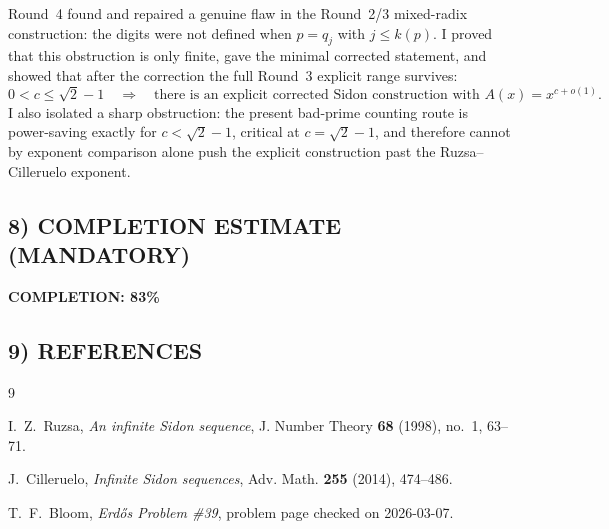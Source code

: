 Round~4 found and repaired a genuine flaw in the Round~2/3 mixed-radix construction: the digits were not defined when $p=q_j$ with $j\le k(p)$.
I proved that this obstruction is only finite, gave the minimal corrected statement, and showed that after the correction the full Round~3 explicit range survives:
\[
0<c\le \sqrt2-1
\quad\Longrightarrow\quad
\text{there is an explicit corrected Sidon construction with }A(x)=x^{c+o(1)}.
\]
I also isolated a sharp obstruction:
the present bad-prime counting route is power-saving exactly for $c<\sqrt2-1$, critical at $c=\sqrt2-1$, and therefore cannot by exponent comparison alone push the explicit construction past the Ruzsa--Cilleruelo exponent.

\subsection*{8) COMPLETION ESTIMATE (MANDATORY)}
\textbf{COMPLETION: 83\%}

\subsection*{9) REFERENCES}
\begin{thebibliography}{9}

I.~Z.~Ruzsa,
\emph{An infinite Sidon sequence},
J. Number Theory \textbf{68} (1998), no.~1, 63--71.

J.~Cilleruelo,
\emph{Infinite Sidon sequences},
Adv. Math. \textbf{255} (2014), 474--486.

T.~F.~Bloom,
\emph{Erd\H{o}s Problem \#39},
problem page checked on 2026-03-07.

\end{thebibliography}
